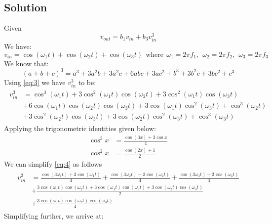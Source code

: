 \documentclass[titlepage]{article}
\begin{document}
\subsection{Solution}
Given
\begin{equation}
    v_{out} = b_1v_{in}+b_3v_{in}^3
\end{equation}
We have:
\begin{equation}
    v_{in} = \cos(\omega_1t)+\cos(\omega_2t)+\cos(\omega_3t) \ \ \text{where} \ \ \omega_1 = 2\pi f_1, \ \ \omega_2 = 2\pi f_2, \ \ \omega_3 = 2\pi f_3
\end{equation}
We know that:
\begin{equation}
    \label{eq:3}
    (a+b+c)^3 = a^3+3a^2b+3a^2c+6abc+3ac^2+b^3+3b^2c+3bc^2+c^3
\end{equation}
Using \ref{eq:3} we have $v_{in}^3$ to be:
\begin{align}
    \label{eq:4}
    \begin{split}
        v_{in}^3 & = \cos^3(\omega_1t)+3\cos^2(\omega_1t)\cos(\omega_2t)+3\cos^2(\omega_1t)\cos(\omega_3t)             \\
        & +6\cos(\omega_1t)\cos(\omega_2t)\cos(\omega_3t)+3\cos(\omega_1t)\cos^2(\omega_3t)+\cos^3(\omega_2t) \\
        & +3\cos^2(\omega_2t)\cos(\omega_3t)+3\cos(\omega_2t)\cos^2(\omega_3t)+\cos^3(\omega_3t)
    \end{split}
\end{align}
Applying the trigonometric identities given below:
\begin{align}
    \cos^3x & = \frac{\cos(3x)+3\cos x}{4} \\
    \cos^2x & = \frac{\cos(2x)+1}{2}
\end{align}
We can simplify \ref{eq:4} as follows
\begin{align}
    \begin{split}
        v_{in}^3 &= \frac{\cos(3\omega_1t)+3\cos(\omega_1t)}{4} + \frac{\cos(3\omega_2t)+3\cos(\omega_2t)}{4}+\frac{\cos(3\omega_3t)+3\cos(\omega_3t)}{4} \\
        & + \frac{3\cos(\omega_1t)\cos(\omega_2t)+3\cos(\omega_1t)\cos(\omega_3t)+3\cos(\omega_2t)\cos(\omega_3t)}{2} \\
        & + \frac{3\cos(\omega_1t)\cos(\omega_2t)\cos(\omega_3t)}{4}
    \end{split}
\end{align}
\newpage
Simplifying further, we arrive at:
\end{document}
